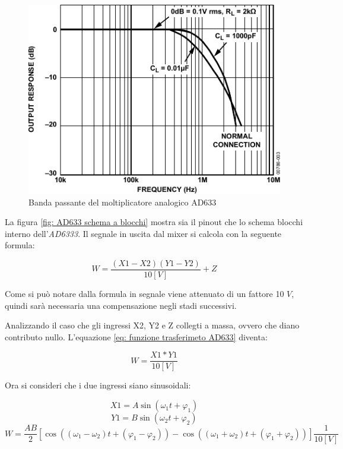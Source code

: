 \documentclass[titlepage]{report}
\begin{document}
	\begin{figure}[H]
		\centering
		\includegraphics[scale=1]{Immagini/ad633_bp.pdf}
		\caption{Banda passante del moltiplicatore analogico AD633}
		\label{fig:sch_ad633}
	\end{figure}

	
	\noindent La figura \ref{fig: AD633 schema a blocchi} mostra sia il pinout che lo schema  blocchi interno dell'\textit{AD6333}. Il segnale in uscita dal mixer si calcola con la seguente formula:

	\begin{equation}
		\label{eq: funzione trasferimeto AD633}
		W = \frac{(X1 - X2)(Y1 - Y2)}{10 [V]}  + Z 
	\end{equation}

	Come si può notare dalla formula in segnale viene attenuato di un fattore 10 $V$, quindi sarà necessaria una compensazione negli stadi successivi. 

	\noindent Analizzando il caso che gli ingressi X2, Y2 e Z collegti a massa, ovvero che diano contributo nullo. L'equazione \ref*{eq: funzione trasferimeto AD633} diventa:


	\begin{equation}
		\label{eq: prodotto sinusoidi AD633}
		W = \frac{X1 * Y1}{10 [V]}
	\end{equation}


	Ora si consideri che i due ingressi siano sinusoidali:


	\begin{equation}
		\label{eq: X1 sinusoidale}
		X1 = A\sin (\omega _1t + \varphi _1)
	\end{equation}
	\begin{equation}
		\label{eq: XY sinusoidale}
		Y1 = B\sin (\omega _2t + \varphi _2)
	\end{equation}
	\begin{equation}
		\label{eq:prodotto sinusoidi con fase}
		W = \frac{AB}{2}[\cos ((\omega _1 - \omega _2)t + (\varphi _1 - \varphi _2)) - \cos ((\omega _1 +\omega _2)t + (\varphi _1 + \varphi _2))]\frac{1}{10[V]}
	\end{equation}
\end{document}
